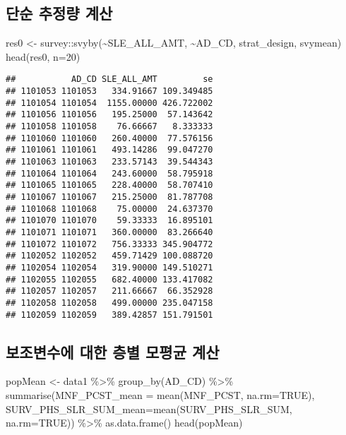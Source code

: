 \documentclass[
]{book}
\newenvironment{Shaded}{\begin{snugshade}}{\end{snugshade}}
\newcommand{\AttributeTok}[1]{\textcolor[rgb]{0.77,0.63,0.00}{#1}}
\newcommand{\ConstantTok}[1]{\textcolor[rgb]{0.00,0.00,0.00}{#1}}
\newcommand{\DecValTok}[1]{\textcolor[rgb]{0.00,0.00,0.81}{#1}}
\newcommand{\FunctionTok}[1]{\textcolor[rgb]{0.00,0.00,0.00}{#1}}
\newcommand{\NormalTok}[1]{#1}
\newcommand{\OtherTok}[1]{\textcolor[rgb]{0.56,0.35,0.01}{#1}}
\newcommand{\SpecialCharTok}[1]{\textcolor[rgb]{0.00,0.00,0.00}{#1}}
\begin{document}
\hypertarget{uxb2e8uxc21c-uxcd94uxc815uxb7c9-uxacc4uxc0b0}{%
\subsection{단순 추정량 계산}\label{uxb2e8uxc21c-uxcd94uxc815uxb7c9-uxacc4uxc0b0}}

\begin{Shaded}
\begin{Highlighting}[]
\NormalTok{res0 }\OtherTok{\textless{}{-}}\NormalTok{ survey}\SpecialCharTok{::}\FunctionTok{svyby}\NormalTok{(}\SpecialCharTok{\textasciitilde{}}\NormalTok{SLE\_ALL\_AMT, }\SpecialCharTok{\textasciitilde{}}\NormalTok{AD\_CD, strat\_design, svymean)}
\FunctionTok{head}\NormalTok{(res0, }\AttributeTok{n=}\DecValTok{20}\NormalTok{)}
\end{Highlighting}
\end{Shaded}

\begin{verbatim}
##           AD_CD SLE_ALL_AMT         se
## 1101053 1101053   334.91667 109.349485
## 1101054 1101054  1155.00000 426.722002
## 1101056 1101056   195.25000  57.143642
## 1101058 1101058    76.66667   8.333333
## 1101060 1101060   260.40000  77.576156
## 1101061 1101061   493.14286  99.047270
## 1101063 1101063   233.57143  39.544343
## 1101064 1101064   243.60000  58.795918
## 1101065 1101065   228.40000  58.707410
## 1101067 1101067   215.25000  81.787708
## 1101068 1101068    75.00000  24.637370
## 1101070 1101070    59.33333  16.895101
## 1101071 1101071   360.00000  83.266640
## 1101072 1101072   756.33333 345.904772
## 1102052 1102052   459.71429 100.088720
## 1102054 1102054   319.90000 149.510271
## 1102055 1102055   682.40000 133.417082
## 1102057 1102057   211.66667  66.352928
## 1102058 1102058   499.00000 235.047158
## 1102059 1102059   389.42857 151.791501
\end{verbatim}

\hypertarget{uxbcf4uxc870uxbcc0uxc218uxc5d0-uxb300uxd55c-uxce35uxbcc4-uxbaa8uxd3c9uxade0-uxacc4uxc0b0}{%
\subsection{보조변수에 대한 층별 모평균 계산}\label{uxbcf4uxc870uxbcc0uxc218uxc5d0-uxb300uxd55c-uxce35uxbcc4-uxbaa8uxd3c9uxade0-uxacc4uxc0b0}}

\begin{Shaded}
\begin{Highlighting}[]
\NormalTok{popMean }\OtherTok{\textless{}{-}}\NormalTok{ data1 }\SpecialCharTok{\%\textgreater{}\%} \FunctionTok{group\_by}\NormalTok{(AD\_CD)   }\SpecialCharTok{\%\textgreater{}\%}  
  \FunctionTok{summarise}\NormalTok{(}\AttributeTok{MNF\_PCST\_mean  =} \FunctionTok{mean}\NormalTok{(MNF\_PCST, }\AttributeTok{na.rm=}\ConstantTok{TRUE}\NormalTok{),  }\AttributeTok{SURV\_PHS\_SLR\_SUM\_mean=}\FunctionTok{mean}\NormalTok{(SURV\_PHS\_SLR\_SUM, }\AttributeTok{na.rm=}\ConstantTok{TRUE}\NormalTok{)) }\SpecialCharTok{\%\textgreater{}\%} \FunctionTok{as.data.frame}\NormalTok{()}
\FunctionTok{head}\NormalTok{(popMean)}
\end{Highlighting}
\end{Shaded}
\end{document}
